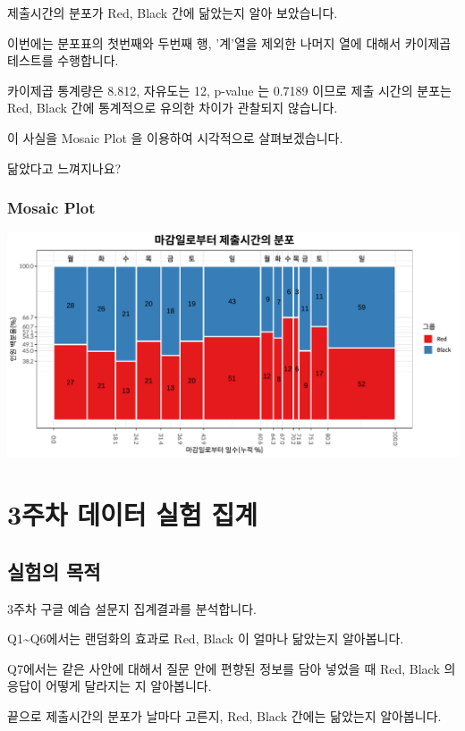 \documentclass[
]{book}
\begin{document}
제출시간의 분포가 Red, Black 간에 닮았는지 알아 보았습니다.

이번에는 분포표의 첫번째와 두번째 행, '계'열을 제외한 나머지 열에 대해서 카이제곱테스트를 수행합니다.

카이제곱 통계량은 8.812, 자유도는 12, p-value 는 0.7189 이므로 제출 시간의 분포는 Red, Black 간에 통계적으로 유의한 차이가 관찰되지 않습니다.

이 사실을 Mosaic Plot 을 이용하여 시각적으로 살펴보겠습니다.

닮았다고 느껴지나요?

\subsection{Mosaic Plot}\label{mosaic-plot-3}

\includegraphics{_main_files/figure-latex/unnamed-chunk-54-1.pdf}

\chapter{3주차 데이터 실험 집계}\label{uxc8fcuxcc28-uxb370uxc774uxd130-uxc2e4uxd5d8-uxc9d1uxacc4-2}

\section{실험의 목적}\label{uxc2e4uxd5d8uxc758-uxbaa9uxc801-2}

3주차 구글 예습 설문지 집계결과를 분석합니다.

Q1\textasciitilde Q6에서는 랜덤화의 효과로 Red, Black 이 얼마나 닮았는지 알아봅니다.

Q7에서는 같은 사안에 대해서 질문 안에 편향된 정보를 담아 넣었을 때 Red, Black 의 응답이 어떻게 달라지는 지 알아봅니다.

끝으로 제출시간의 분포가 날마다 고른지, Red, Black 간에는 닮았는지 알아봅니다.
\end{document}
